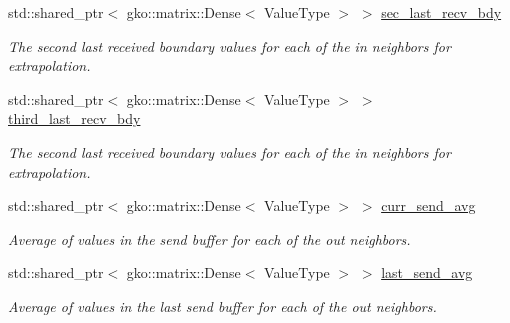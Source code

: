 \begin{DoxyCompactItemize}
\mbox{\label{structschwz_1_1Communicate_1_1comm__struct_a990b6fc845b61bd70bdf49583d48a231}} 
std\+::shared\+\_\+ptr$<$ gko\+::matrix\+::\+Dense$<$ Value\+Type $>$ $>$ \hyperlink{structschwz_1_1Communicate_1_1comm__struct_a990b6fc845b61bd70bdf49583d48a231}{sec\+\_\+last\+\_\+recv\+\_\+bdy}
\begin{DoxyCompactList}\small\item\em The second last received boundary values for each of the in neighbors for extrapolation. \end{DoxyCompactList}\item 
\mbox{\label{structschwz_1_1Communicate_1_1comm__struct_afebb324417245d6dc62775fcf88ed921}} 
std\+::shared\+\_\+ptr$<$ gko\+::matrix\+::\+Dense$<$ Value\+Type $>$ $>$ \hyperlink{structschwz_1_1Communicate_1_1comm__struct_afebb324417245d6dc62775fcf88ed921}{third\+\_\+last\+\_\+recv\+\_\+bdy}
\begin{DoxyCompactList}\small\item\em The second last received boundary values for each of the in neighbors for extrapolation. \end{DoxyCompactList}\item 
\mbox{\label{structschwz_1_1Communicate_1_1comm__struct_accdf4b92ca6d9a5f0c007a05b9ac4e79}} 
std\+::shared\+\_\+ptr$<$ gko\+::matrix\+::\+Dense$<$ Value\+Type $>$ $>$ \hyperlink{structschwz_1_1Communicate_1_1comm__struct_accdf4b92ca6d9a5f0c007a05b9ac4e79}{curr\+\_\+send\+\_\+avg}
\begin{DoxyCompactList}\small\item\em Average of values in the send buffer for each of the out neighbors. \end{DoxyCompactList}\item 
\mbox{\label{structschwz_1_1Communicate_1_1comm__struct_a1711878fc6041fd6be94d452907268ca}} 
std\+::shared\+\_\+ptr$<$ gko\+::matrix\+::\+Dense$<$ Value\+Type $>$ $>$ \hyperlink{structschwz_1_1Communicate_1_1comm__struct_a1711878fc6041fd6be94d452907268ca}{last\+\_\+send\+\_\+avg}
\begin{DoxyCompactList}\small\item\em Average of values in the last send buffer for each of the out neighbors. \end{DoxyCompactList}\item 

\end{DoxyCompactItemize}
